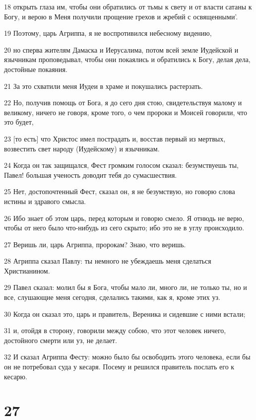 \par 18 открыть глаза им, чтобы они обратились от тьмы к свету и от власти сатаны к Богу, и верою в Меня получили прощение грехов и жребий с освященными'.
\par 19 Поэтому, царь Агриппа, я не воспротивился небесному видению,
\par 20 но сперва жителям Дамаска и Иерусалима, потом всей земле Иудейской и язычникам проповедывал, чтобы они покаялись и обратились к Богу, делая дела, достойные покаяния.
\par 21 За это схватили меня Иудеи в храме и покушались растерзать.
\par 22 Но, получив помощь от Бога, я до сего дня стою, свидетельствуя малому и великому, ничего не говоря, кроме того, о чем пророки и Моисей говорили, что это будет,
\par 23 [то есть] что Христос имел пострадать и, восстав первый из мертвых, возвестить свет народу (Иудейскому) и язычникам.
\par 24 Когда он так защищался, Фест громким голосом сказал: безумствуешь ты, Павел! большая ученость доводит тебя до сумасшествия.
\par 25 Нет, достопочтенный Фест, сказал он, я не безумствую, но говорю слова истины и здравого смысла.
\par 26 Ибо знает об этом царь, перед которым и говорю смело. Я отнюдь не верю, чтобы от него было что-нибудь из сего скрыто; ибо это не в углу происходило.
\par 27 Веришь ли, царь Агриппа, пророкам? Знаю, что веришь.
\par 28 Агриппа сказал Павлу: ты немного не убеждаешь меня сделаться Христианином.
\par 29 Павел сказал: молил бы я Бога, чтобы мало ли, много ли, не только ты, но и все, слушающие меня сегодня, сделались такими, как я, кроме этих уз.
\par 30 Когда он сказал это, царь и правитель, Вереника и сидевшие с ними встали;
\par 31 и, отойдя в сторону, говорили между собою, что этот человек ничего, достойного смерти или уз, не делает.
\par 32 И сказал Агриппа Фесту: можно было бы освободить этого человека, если бы он не потребовал суда у кесаря. Посему и решился правитель послать его к кесарю.

\chapter{27}

